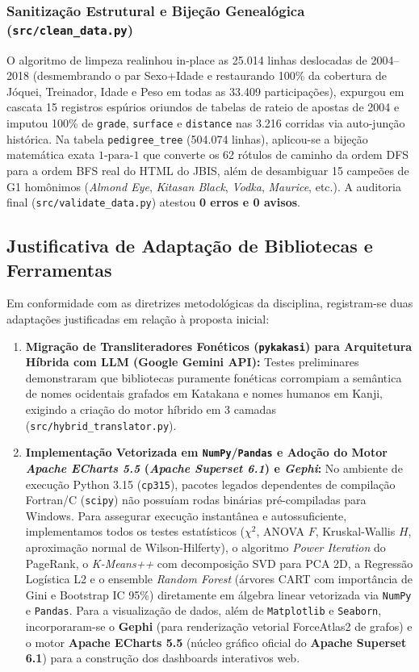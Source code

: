 \documentclass[conference]{IEEEtran}
\begin{document}
\subsubsection{Sanitização Estrutural e Bijeção Genealógica (\texttt{src/clean\_data.py})}
O algoritmo de limpeza realinhou in-place as 25.014 linhas deslocadas de 2004--2018 (desmembrando o par Sexo+Idade e restaurando 100\%
da cobertura de Jóquei, Treinador, Idade e Peso em todas as 33.409 participações), expurgou em cascata 15 registros espúrios oriundos de tabelas de rateio de apostas de 2004 e imputou 100\%
de \texttt{grade}, \texttt{surface} e \texttt{distance} nas 3.216 corridas via auto-junção histórica. Na tabela \texttt{pedigree\_tree} (504.074 linhas), aplicou-se a bijeção matemática exata $1\text{-para-}1$ que converte os 62 rótulos de caminho da ordem DFS para a ordem BFS real do HTML do JBIS, além de desambiguar 15 campeões de G1 homônimos (\textit{Almond Eye}, \textit{Kitasan Black}, \textit{Vodka}, \textit{Maurice}, etc.). A auditoria final (\texttt{src/validate\_data.py}) atestou \textbf{0 erros e 0 avisos}.

\subsection{Justificativa de Adaptação de Bibliotecas e Ferramentas}
Em conformidade com as diretrizes metodológicas da disciplina, registram-se duas adaptações justificadas em relação à proposta inicial:
\begin{enumerate}
    \item \textbf{Migração de Transliteradores Fonéticos (\texttt{pykakasi}) para Arquitetura Híbrida com LLM (Google Gemini API):} Testes preliminares demonstraram que bibliotecas puramente fonéticas corrompiam a semântica de nomes ocidentais grafados em Katakana e nomes humanos em Kanji, exigindo a criação do motor híbrido em 3 camadas (\texttt{src/hybrid\_translator.py}).
    \item \textbf{Implementação Vetorizada em \texttt{NumPy}/\texttt{Pandas} e Adoção do Motor \textit{Apache ECharts 5.5} (\textit{Apache Superset 6.1}) e \textit{Gephi}:} No ambiente de execução Python 3.15 (\texttt{cp315}), pacotes legados dependentes de compilação Fortran/C (\texttt{scipy}) não possuíam rodas binárias pré-compiladas para Windows. Para assegurar execução instantânea e autossuficiente, implementamos todos os testes estatísticos ($\chi^2$, ANOVA $F$, Kruskal-Wallis $H$, aproximação normal de Wilson-Hilferty), o algoritmo \textit{Power Iteration} do PageRank, o \textit{K-Means++} com decomposição SVD para PCA 2D, a Regressão Logística L2 e o ensemble \textit{Random Forest} (árvores CART com importância de Gini e Bootstrap IC 95\%)
diretamente em álgebra linear vetorizada via \texttt{NumPy} e \texttt{Pandas}. Para a visualização de dados, além de \texttt{Matplotlib} e \texttt{Seaborn}, incorporaram-se o \textbf{Gephi} (para renderização vetorial ForceAtlas2 de grafos) e o motor \textbf{Apache ECharts 5.5} (núcleo gráfico oficial do \textbf{Apache Superset 6.1}) para a construção dos dashboards interativos web.
\end{enumerate}
\end{document}
